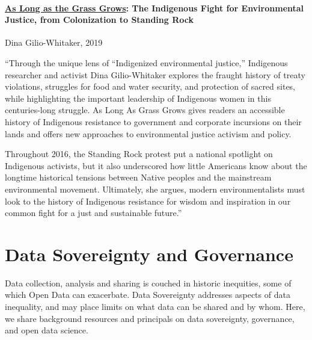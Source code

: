 \documentclass[
]{book}
\begin{document}
\hypertarget{as-long-as-the-grass-grows-the-indigenous-fight-for-environmental-justice-from-colonization-to-standing-rock}{%
\subsubsection*{\texorpdfstring{\href{http://www.beacon.org/As-Long-as-Grass-Grows-P1445.aspx}{As Long as the Grass Grows}: The Indigenous Fight for Environmental Justice, from Colonization to Standing Rock}{As Long as the Grass Grows: The Indigenous Fight for Environmental Justice, from Colonization to Standing Rock}}\label{as-long-as-the-grass-grows-the-indigenous-fight-for-environmental-justice-from-colonization-to-standing-rock}}

Dina Gilio-Whitaker, 2019

``Through the unique lens of ``Indigenized environmental justice,'' Indigenous researcher and activist Dina Gilio-Whitaker explores the fraught history of treaty violations, struggles for food and water security, and protection of sacred sites, while highlighting the important leadership of Indigenous women in this centuries-long struggle. As Long As Grass Grows gives readers an accessible history of Indigenous resistance to government and corporate incursions on their lands and offers new approaches to environmental justice activism and policy.

Throughout 2016, the Standing Rock protest put a national spotlight on Indigenous activists, but it also underscored how little Americans know about the longtime historical tensions between Native peoples and the mainstream environmental movement. Ultimately, she argues, modern environmentalists must look to the history of Indigenous resistance for wisdom and inspiration in our common fight for a just and sustainable future.''

\hypertarget{data-sovereignty-and-governance}{%
\chapter{Data Sovereignty and Governance}\label{data-sovereignty-and-governance}}

Data collection, analysis and sharing is couched in historic inequities, some of which Open Data can exacerbate. Data Sovereignty addresses aspects of data inequality, and may place limits on what data can be shared and by whom. Here, we share background resources and principals on data sovereignty, governance, and open data science.
\end{document}
